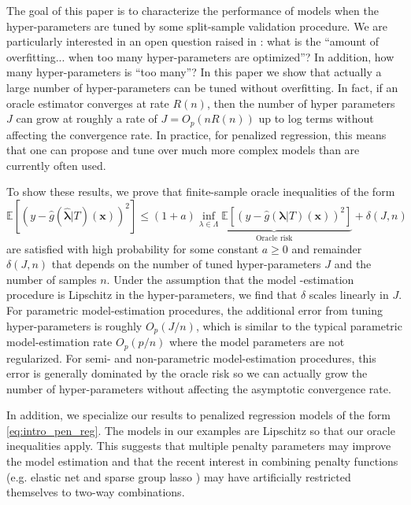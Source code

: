 \documentclass[12pt]{article} %
\theoremstyle{definition}
\begin{document}
The goal of this paper is to characterize the performance of models when the hyper-parameters are tuned by some split-sample validation procedure. We are particularly interested in an open question raised in \citet{bengio2000gradient}: what is the ``amount of overfitting... when too many hyper-parameters are optimized''? In addition, how many hyper-parameters is ``too many''? In this paper we show that actually a large number of hyper-parameters can be tuned without overfitting. In fact, if an oracle estimator converges at rate $R(n)$, then the number of hyper parameters $J$ can grow at roughly a rate of $J = O_p(nR(n))$ up to log terms without affecting the convergence rate. In practice, for penalized regression, this means that one can propose and tune over much more complex models than are currently often used.

To show these results, we prove that finite-sample oracle inequalities of the form
\begin{equation}
\label{thrm:intro_oracle_ineq}
\mathbb{E} \left [
\left ( y - \hat{g}(\hat{\boldsymbol{\lambda}} | T)(\boldsymbol{x}) \right )^2
\right ]
\le
(1+a)
\underbrace{
	\inf_{\lambda \in \Lambda}
	\mathbb{E} \left [
	\left ( y - \hat{g}(\boldsymbol{\lambda} | T)(\boldsymbol{x}) \right )^2
	\right ]
}_{\text{Oracle risk}}
+ \delta \left(J,n\right)
\end{equation}
are satisfied with high probability for some constant $a \ge 0$ and remainder $\delta(J,n)$ that depends on the number of tuned hyper-parameters $J$ and the number of samples $n$.
Under the assumption that the model -estimation procedure is Lipschitz in the hyper-parameters, we find that $\delta$ scales linearly in $J$.
For parametric model-estimation procedures, the additional error from tuning hyper-parameters is roughly $O_p(J/n)$, which is similar to the typical parametric model-estimation rate $O_p(p/n)$ where the model parameters are not regularized.
For semi- and non-parametric model-estimation procedures, this error is generally dominated by the oracle risk so we can actually grow the number of hyper-parameters without affecting the asymptotic convergence rate.

In addition, we specialize our results to penalized regression models of the form \eqref{eq:intro_pen_reg}.
The models in our examples are Lipschitz so that our oracle inequalities apply.
This suggests that multiple penalty parameters may improve the model estimation and that the recent interest in combining penalty functions (e.g. elastic net and sparse group lasso \citep{zou2003regression, simon2013sparse}) may have artificially restricted themselves to two-way combinations.
\end{document}
